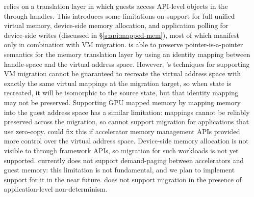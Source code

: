 \AvA relies on a translation layer in which guests access API-level objects in the \worker through handles.
This introduces some limitations on support for full unified virtual memory, device-side memory allocation, and application polling for
device-side writes (discussed in \S\ref{s:api:mapped-mem}), most of which manifest only in combination with
VM migration.
\AvA is able to preserve pointer-is-a-pointer semantics for the memory translation
layer by using an identity mapping between handle-space and the \worker virtual address space.
However, \AvA's techniques
for supporting VM migration cannot be guaranteed to recreate the \worker virtual address space with exactly the same virtual mappings at the migration target,
so when state is recreated, it will be isomorphic to the source state, but that identity mapping may not be preserved. Supporting GPU mapped memory by mapping \worker memory into the
guest address space has a similar limitation: mappings cannot be reliably preserved across the migration, so \AvA cannot support migration for applications that use zero-copy.
\AvA could fix this if accelerator memory management APIs provided more control over the virtual address space.
Device-side memory allocation is not visible to \AvA through framework APIs, so migration for such workloads
is not yet supported. \AvA currently does not support demand-paging between accelerators and guest memory: this
limitation is not fundamental, and we plan to implement support for it in the near future.
\AvA does not support migration in the presence of application-level non-determinism. %



